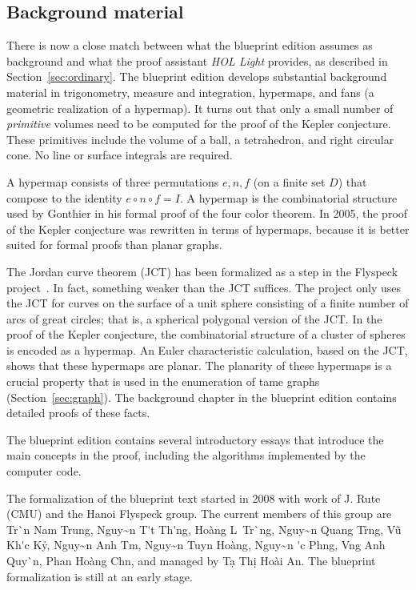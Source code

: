 \documentclass[11pt]{amsart}
\def\vn{\fontencoding{T5}\selectfont}
\begin{document}
 

\subsection{Background material}

There is now a close
match between what the blueprint edition assumes as background and what the proof assistant {\it HOL Light}
provides, as described in Section~\ref{sec:ordinary}.  The blueprint edition develops 
substantial background
material in trigonometry, measure and integration, hypermaps, and fans (a geometric realization of a hypermap).   It turns out
that only a small number of {\it primitive} volumes need to be computed for the proof of the Kepler
conjecture. These primitives include the volume of a ball, a tetrahedron, and right circular cone.  
No line or surface integrals are required.

A hypermap consists of  three permutations $e,n,f$ (on a finite set $D$) 
that compose to the identity $e\circ n\circ f= I$.  A hypermap is the
combinatorial structure used by Gonthier in his formal proof of the four color theorem.  In 2005,
the proof of the Kepler conjecture was rewritten in terms of hypermaps, because it is better suited
for formal proofs than planar graphs.  

The Jordan curve theorem (JCT) has been formalized as a step in the Flyspeck project~\cite{Hales:2007:jordan}.  In fact, something weaker than the JCT
suffices.  The project only uses the JCT for curves on
the surface of a unit sphere consisting of a finite number of arcs of great circles; that is, a 
spherical polygonal version of the JCT.  In the proof of the Kepler conjecture, the combinatorial structure of
a cluster of spheres is encoded as a hypermap.  An Euler characteristic calculation, based on the JCT, shows that
these hypermaps are planar.  The planarity of these hypermaps is a crucial property that is used in the enumeration
of tame graphs (Section~\ref{sec:graph}).
The background chapter in the blueprint edition contains detailed proofs of these facts.


The blueprint edition contains several introductory essays that introduce 
the main concepts in the proof, including the algorithms implemented by the computer code.

The formalization of the blueprint text started in
2008 with work of J. Rute (CMU) and the Hanoi Flyspeck group. The current members of this group are {\vn Tr\`\acircumflex n Nam Trung}, {\vn Nguy\~\ecircumflex n T\'\acircumflex t Th\'\abreve ng}, {\vn Ho\`ang L\ecircumflex\ Tr\uhorn\`\ohorn ng}, {\vn Nguy\~\ecircumflex n Quang Tr\uhorn\h\ohorn ng}, {\vn V\~u Kh\'\abreve c K\h y}, {\vn Nguy\~\ecircumflex n Anh T\acircumflex m}, {\vn Nguy\~\ecircumflex n Tuy\ecircumflex n Ho\`ang}, {\vn Nguy\~\ecircumflex n \DJ\'\uhorn c Ph\uhorn \ohorn ng}, {\vn V\uhorn \ohorn ng Anh Quy\`\ecircumflex n}, {\vn Phan Ho\`ang Ch\ohorn n}, and managed by {\vn T\d a Th\d i Ho\`ai An}.  The blueprint formalization is still at an early stage.
\end{document}
